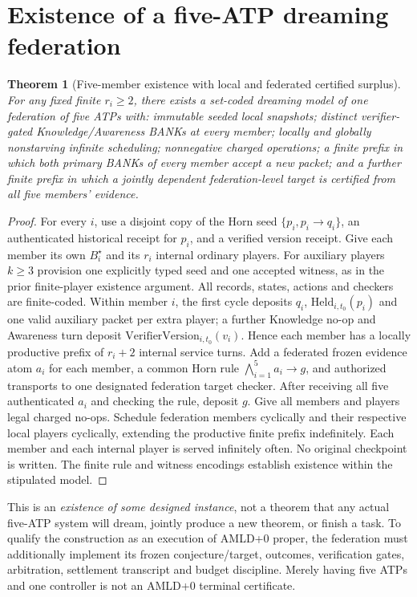 \documentclass[11pt]{article}
\newtheorem{theorem}{Theorem}[section]
\begin{document}
\section{Existence of a five-ATP dreaming federation}
\begin{theorem}[Five-member existence with local and federated certified surplus]
For any fixed finite $r_i\ge2$, there exists a set-coded dreaming model of one federation of five ATPs with: immutable seeded local snapshots; distinct verifier-gated Knowledge/Awareness BANKs at every member; locally and globally nonstarving infinite scheduling; nonnegative charged operations; a finite prefix in which both primary BANKs of every member accept a new packet; and a further finite prefix in which a jointly dependent federation-level target is certified from all five members' evidence.
\end{theorem}
\begin{proof}For every $i$, use a disjoint copy of the Horn seed $\{p_i,p_i\to q_i\}$, an authenticated historical receipt for $p_i$, and a verified version receipt. Give each member its own $B_i^\star$ and its $r_i$ internal ordinary players. For auxiliary players $k\ge3$ provision one explicitly typed seed and one accepted witness, as in the prior finite-player existence argument. All records, states, actions and checkers are finite-coded. Within member $i$, the first cycle deposits $q_i$, $\mathrm{Held}_{i,t_0}(p_i)$ and one valid auxiliary packet per extra player; a further Knowledge no-op and Awareness turn deposit $\mathrm{VerifierVersion}_{i,t_0}(v_i)$. Hence each member has a locally productive prefix of $r_i+2$ internal service turns. Add a federated frozen evidence atom $a_i$ for each member, a common Horn rule $\bigwedge_{i=1}^5a_i\to g$, and authorized transports to one designated federation target checker. After receiving all five authenticated $a_i$ and checking the rule, deposit $g$. Give all members and players legal charged no-ops. Schedule federation members cyclically and their respective local players cyclically, extending the productive finite prefix indefinitely. Each member and each internal player is served infinitely often. No original checkpoint is written. The finite rule and witness encodings establish existence within the stipulated model.\end{proof}
This is an \emph{existence of some designed instance}, not a theorem that any actual five-ATP system will dream, jointly produce a new theorem, or finish a task. To qualify the construction as an execution of AMLD+0 proper, the federation must additionally implement its frozen conjecture/target, outcomes, verification gates, arbitration, settlement transcript and budget discipline. Merely having five ATPs and one controller is not an AMLD+0 terminal certificate.
\end{document}
